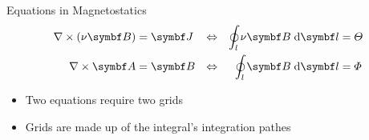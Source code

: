%
%
%
%
%

\begin{frame}{Equations in Magnetostatics}
  \begin{align*}
    \label{eq:1}
    \nabla\times\left(\nu\vect{B}\right) &= \vect{J} &\Leftrightarrow&&
    \ointeg{l}{\nu\vect{B}}{\vect{l}}&= \Theta \\
    \nabla\times\vect{A} &= \vect{B} &\Leftrightarrow&&
    \ointeg{l}{\vect{B}}{\vect{l}}&= \Phi
  \end{align*}
  \begin{itemize}
  \item Two equations require two grids
  \item Grids are made up of the integral's integration pathes
  \end{itemize}
\end{frame}


